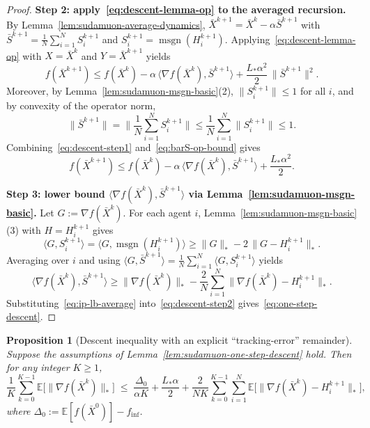 \documentclass{article}
\newtheorem{proposition}{Proposition}
\begin{document}
\begin{proof}
\medskip\noindent\textbf{Step 2: apply~\eqref{eq:descent-lemma-op} to the averaged recursion.}
By Lemma~\ref{lem:sudamuon-average-dynamics},
$\bar X^{k+1}=\bar X^k-\alpha\bar S^{k+1}$ with $\bar S^{k+1}=\frac{1}{N}\sum_{i=1}^N S_i^{k+1}$ and $S_i^{k+1}=\operatorname{msgn}(H_i^{k+1})$.
Applying~\eqref{eq:descent-lemma-op} with $X=\bar X^k$ and $Y=\bar X^{k+1}$ yields
\begin{equation}
\label{eq:descent-step1}
 f(\bar X^{k+1})
 \le f(\bar X^k) - \alpha\,\langle \nabla f(\bar X^k),\bar S^{k+1}\rangle
 + \frac{L_*\alpha^2}{2}\,\|\bar S^{k+1}\|^2.
\end{equation}
Moreover, by Lemma~\ref{lem:sudamuon-msgn-basic}(2), $\|S_i^{k+1}\|\le 1$ for all $i$, and by convexity of the operator norm,
\begin{equation}
\label{eq:barS-op-bound}
 \|\bar S^{k+1}\|
 = \Big\|\frac{1}{N}\sum_{i=1}^N S_i^{k+1}\Big\|
 \le \frac{1}{N}\sum_{i=1}^N \|S_i^{k+1}\|
 \le 1.
\end{equation}
Combining~\eqref{eq:descent-step1} and~\eqref{eq:barS-op-bound} gives
\begin{equation}
\label{eq:descent-step2}
 f(\bar X^{k+1})
 \le f(\bar X^k) - \alpha\,\langle \nabla f(\bar X^k),\bar S^{k+1}\rangle
 + \frac{L_*\alpha^2}{2}.
\end{equation}

\medskip\noindent\textbf{Step 3: lower bound $\langle \nabla f(\bar X^k),\bar S^{k+1}\rangle$ via Lemma~\ref{lem:sudamuon-msgn-basic}.}
Let $G:=\nabla f(\bar X^k)$. For each agent $i$, Lemma~\ref{lem:sudamuon-msgn-basic}(3) with $H=H_i^{k+1}$ gives
\[
 \langle G, S_i^{k+1}\rangle
 = \langle G,\operatorname{msgn}(H_i^{k+1})\rangle
 \ge \|G\|_* - 2\,\|G-H_i^{k+1}\|_*.
\]
Averaging over $i$ and using $\langle G,\bar S^{k+1}\rangle=\frac{1}{N}\sum_{i=1}^N \langle G,S_i^{k+1}\rangle$ yields
\begin{equation}
\label{eq:ip-lb-average}
 \langle \nabla f(\bar X^k),\bar S^{k+1}\rangle
 \ge \|\nabla f(\bar X^k)\|_* - \frac{2}{N}\sum_{i=1}^N \|\nabla f(\bar X^k)-H_i^{k+1}\|_*.
\end{equation}
Substituting~\eqref{eq:ip-lb-average} into~\eqref{eq:descent-step2} gives~\eqref{eq:one-step-descent}.
\end{proof}


\begin{proposition}[Descent inequality with an explicit ``tracking-error'' remainder]
\label{prop:telescoping-descent}
Suppose the assumptions of Lemma~\ref{lem:sudamuon-one-step-descent} hold.
Then for any integer $K\ge 1$,
\begin{equation}
\label{eq:telescoping-descent}
\frac{1}{K}\sum_{k=0}^{K-1}\mathbb{E}\big[\|\nabla f(\bar X^k)\|_*\big]
\;\le\;
\frac{\Delta_0}{\alpha K}
+\frac{L_*\alpha}{2}
+\frac{2}{NK}\sum_{k=0}^{K-1}\sum_{i=1}^N\mathbb{E}\big[\|\nabla f(\bar X^k)-H_i^{k+1}\|_*\big],
\end{equation}
where $\Delta_0:=\mathbb{E}[f(\bar X^0)]-f_{\inf}$.
\end{proposition}
\end{document}
